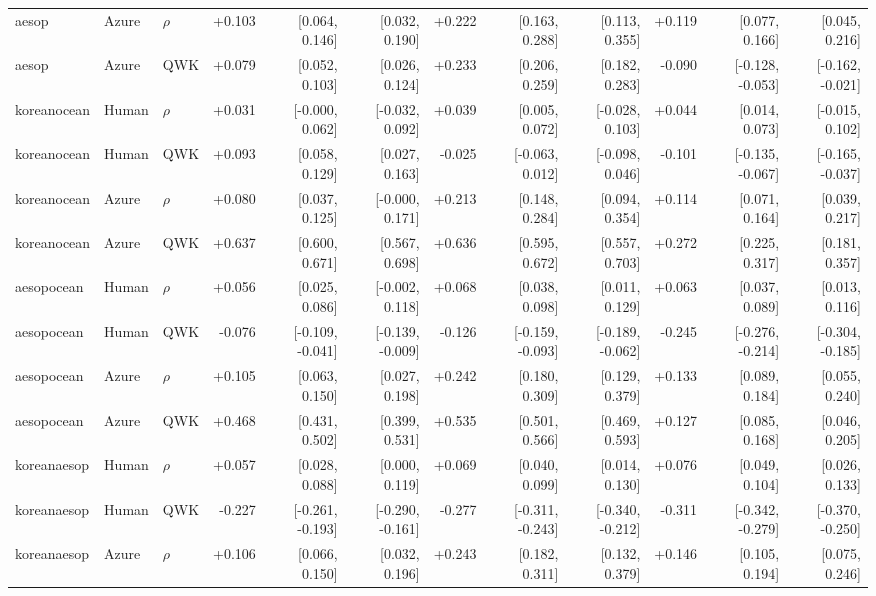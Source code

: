 \documentclass[10pt]{article}
\begin{document}
\begin{landscape}
\begin{longtable}{@{}lllrrrrrrrrr@{}}
aesop & Azure & $\rho$ & +0.103 & [0.064, 0.146] & [0.032, 0.190] & +0.222 & [0.163, 0.288] & [0.113, 0.355] & +0.119 & [0.077, 0.166] & [0.045, 0.216]\\
aesop & Azure & QWK & +0.079 & [0.052, 0.103] & [0.026, 0.124] & +0.233 & [0.206, 0.259] & [0.182, 0.283] & -0.090 & [-0.128, -0.053] & [-0.162, -0.021]\\
\addlinespace[2pt]
koreanocean & Human & $\rho$ & +0.031 & [-0.000, 0.062] & [-0.032, 0.092] & +0.039 & [0.005, 0.072] & [-0.028, 0.103] & +0.044 & [0.014, 0.073] & [-0.015, 0.102]\\
koreanocean & Human & QWK & +0.093 & [0.058, 0.129] & [0.027, 0.163] & -0.025 & [-0.063, 0.012] & [-0.098, 0.046] & -0.101 & [-0.135, -0.067] & [-0.165, -0.037]\\
koreanocean & Azure & $\rho$ & +0.080 & [0.037, 0.125] & [-0.000, 0.171] & +0.213 & [0.148, 0.284] & [0.094, 0.354] & +0.114 & [0.071, 0.164] & [0.039, 0.217]\\
koreanocean & Azure & QWK & +0.637 & [0.600, 0.671] & [0.567, 0.698] & +0.636 & [0.595, 0.672] & [0.557, 0.703] & +0.272 & [0.225, 0.317] & [0.181, 0.357]\\
\addlinespace[2pt]
aesopocean & Human & $\rho$ & +0.056 & [0.025, 0.086] & [-0.002, 0.118] & +0.068 & [0.038, 0.098] & [0.011, 0.129] & +0.063 & [0.037, 0.089] & [0.013, 0.116]\\
aesopocean & Human & QWK & -0.076 & [-0.109, -0.041] & [-0.139, -0.009] & -0.126 & [-0.159, -0.093] & [-0.189, -0.062] & -0.245 & [-0.276, -0.214] & [-0.304, -0.185]\\
aesopocean & Azure & $\rho$ & +0.105 & [0.063, 0.150] & [0.027, 0.198] & +0.242 & [0.180, 0.309] & [0.129, 0.379] & +0.133 & [0.089, 0.184] & [0.055, 0.240]\\
aesopocean & Azure & QWK & +0.468 & [0.431, 0.502] & [0.399, 0.531] & +0.535 & [0.501, 0.566] & [0.469, 0.593] & +0.127 & [0.085, 0.168] & [0.046, 0.205]\\
\addlinespace[2pt]
koreanaesop & Human & $\rho$ & +0.057 & [0.028, 0.088] & [0.000, 0.119] & +0.069 & [0.040, 0.099] & [0.014, 0.130] & +0.076 & [0.049, 0.104] & [0.026, 0.133]\\
koreanaesop & Human & QWK & -0.227 & [-0.261, -0.193] & [-0.290, -0.161] & -0.277 & [-0.311, -0.243] & [-0.340, -0.212] & -0.311 & [-0.342, -0.279] & [-0.370, -0.250]\\
koreanaesop & Azure & $\rho$ & +0.106 & [0.066, 0.150] & [0.032, 0.196] & +0.243 & [0.182, 0.311] & [0.132, 0.379] & +0.146 & [0.105, 0.194] & [0.075, 0.246]\\

\end{longtable}
\end{landscape}
\end{document}

